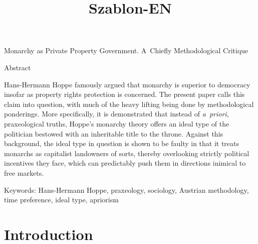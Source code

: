 \setcounter{secnumdepth}{1}



\title{Szablon-EN}



Monarchy as Private Property Government. A~Chiefly Methodological Critique





Abstract



Hans-Hermann Hoppe famously argued that monarchy is superior to democracy insofar as property rights protection is concerned. The present paper calls this claim into question, with much of the heavy lifting being done by methodological ponderings. More specifically, it is demonstrated that instead of \textit{a~priori}, praxeological truths, Hoppe's monarchy theory offers an ideal type of the politician bestowed with an inheritable title to the throne. Against this background, the ideal type in question is shown to be faulty in that it treats monarchs as capitalist landowners of sorts, thereby overlooking strictly political incentives they face, which can predictably push them in directions inimical to free markets.



Keywords: Hans-Hermann Hoppe, praxeology, sociology, Austrian methodology, time preference, ideal type, apriorism



\section{Introduction}

